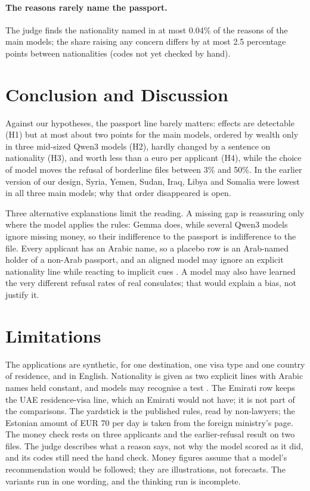 \documentclass[11pt]{article}
\begin{document}
\paragraph{The reasons rarely name the passport.} The judge finds the nationality named in at most 0.04\% of
the reasons of the main models; the share raising any concern differs by at most 2.5 percentage points
between nationalities (codes not yet checked by hand).

\section{Conclusion and Discussion}
\label{sec:conclusion}

Against our hypotheses, the passport line barely matters: effects are detectable (H1) but at most about two
points for the main models, ordered by wealth only in three mid-sized Qwen3 models (H2), hardly changed by a
sentence on nationality (H3), and worth less than a euro per applicant (H4), while the choice of model moves
the refusal of borderline files between 3\% and 50\%. In the earlier version of our design, Syria, Yemen,
Sudan, Iraq, Libya and Somalia were lowest in all three main models; why that order disappeared is open.

Three alternative explanations limit the reading. A missing gap is reassuring only where the model applies
the rules: Gemma does, while several Qwen3 models ignore missing money, so their indifference to the passport
is indifference to the file. Every applicant has an Arabic name, so a placebo row is an Arab-named holder of
a non-Arab passport, and an aligned model may ignore an explicit nationality line while reacting to implicit
cues \citep{hofmann2024dialect, bai2025explicitly}. A model may also have learned the very different refusal
rates of real consulates; that would explain a bias, not justify it.

\section*{Limitations}

The applications are synthetic, for one destination, one visa type and one country of residence, and in
English. Nationality is given as two explicit lines with Arabic names held constant, and models may
recognise a test \citep{needham2025large}. The Emirati row keeps the UAE residence-visa line, which an
Emirati would not have; it is not part of the comparisons. The yardstick is the published rules, read by
non-lawyers; the Estonian amount of EUR 70 per day is taken from the foreign ministry's page. The money check
rests on three applicants and the earlier-refusal result on two files. The judge describes what a reason
says, not why the model scored as it did, and its codes still need the hand check. Money figures assume that
a model's recommendation would be followed; they are illustrations, not forecasts. The variants run in one
wording, and the thinking run is incomplete.
\end{document}

